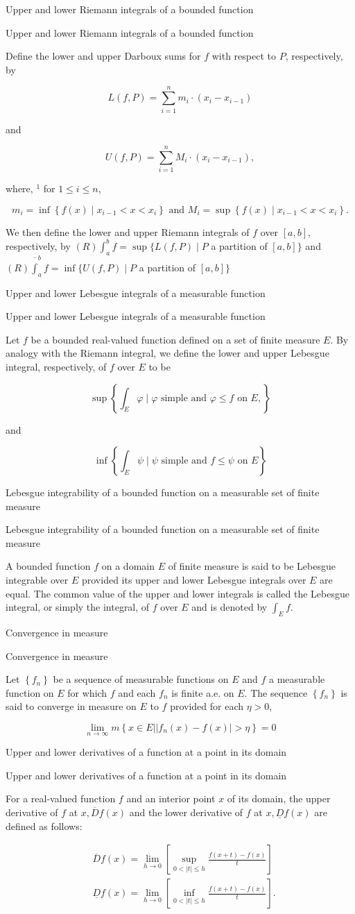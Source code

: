 \documentclass[17pt]{extarticle}
\renewcommand{\bar}[1]{\overline{#1}}
\newcommand{\boxset}[2]{\begin{mdframed}[style=darkQuesion]
#1
\end{mdframed}
\newpage
\begin{mdframed}[style=darkQuesion]
#1
  \end{mdframed}
\begin{mdframed}[style=darkAnswer]
#2
  \end{mdframed}
  \newpage
}
\begin{document}
\boxset{Upper and lower Riemann integrals of a bounded function}
{
Define the lower and upper Darboux sums for $f$ with respect to $P$, respectively, by

\[
L(f, P)=\sum_{i=1}^{n} m_{i} \cdot\left(x_{i}-x_{i-1}\right)
\]

and

\[
U(f, P)=\sum_{i=1}^{n} M_{i} \cdot\left(x_{i}-x_{i-1}\right),
\]

where, ${ }^{1}$ for $1 \leq i \leq n$,

\[
m_{i}=\inf \left\{f(x) \mid x_{i-1}<x<x_{i}\right\} \text { and } M_{i}=\sup \left\{f(x) \mid x_{i-1}<x<x_{i}\right\} .
\]

We then define the lower and upper Riemann integrals of $f$ over $[a, b]$, respectively, by
$(R) \int_{a}^{b} f=\sup \{L(f, P) \mid P$ a partition of $[a, b]\}$
and
$(R) \bar{\int}_{a}^{b} f=\inf \{U(f, P) \mid P$ a partition of $[a, b]\}$
}
\boxset{Upper and lower Lebesgue integrals of a measurable function}
{
Let $f$ be a bounded real-valued function defined on a set of finite measure $E$. By analogy with the Riemann integral, we define the lower and upper Lebesgue integral, respectively, of $f$ over $E$ to be

\[
\sup \left\{\int_{E} \varphi \mid \varphi \text { simple and } \varphi \leq f \text { on } E,\right\}
\]

and

\[
\inf \left\{\int_{E} \psi \mid \psi \text { simple and } f \leq \psi \text { on } E\right\}
\]

}
\boxset{Lebesgue integrability of a bounded function on a measurable set of finite measure}
{
A bounded function $f$ on a domain $E$ of finite measure is said to be Lebesgue integrable over $E$ provided its upper and lower Lebesgue integrals over $E$ are equal. The common value of the upper and lower integrals is called the Lebesgue integral, or simply the integral, of $f$ over $E$ and is denoted by $\int_{E} f$.
}
\boxset{Convergence in measure}
{
Let $\left\{f_{n}\right\}$ be a sequence of measurable functions on $E$ and $f$ a measurable function on $E$ for which $f$ and each $f_{n}$ is finite a.e. on $E$. The sequence $\left\{f_{n}\right\}$ is said to converge in measure on $E$ to $f$ provided for each $\eta>0$,

\[
\lim _{n \rightarrow \infty} m\left\{x \in E|| f_{n}(x)-f(x) \mid>\eta\right\}=0
\]

}
\boxset{Upper and lower derivatives of a function at a point in its domain}
{
For a real-valued function $f$ and an interior point $x$ of its domain, the upper derivative of $f$ at $x, \bar{D} f(x)$ and the lower derivative of $f$ at $x, \underline{D} f(x)$ are defined as follows:

\[
\begin{aligned}
&\bar{D} f(x)=\lim _{h \rightarrow 0}\left[\sup _{0<|t| \leq h} \frac{f(x+t)-f(x)}{t}\right] \\
&\underline{D} f(x)=\lim _{h \rightarrow 0}\left[\inf _{0<|t| \leq h} \frac{f(x+t)-f(x)}{t}\right] .
\end{aligned}
\]

}
\end{document}
